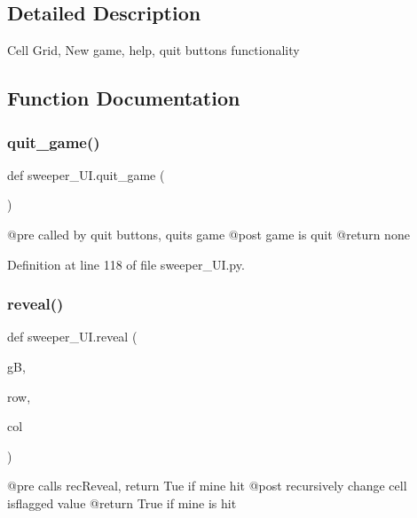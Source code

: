 \subsection{Detailed Description}
\begin{DoxyVerb}Cell Grid, New game, help, quit buttons functionality\end{DoxyVerb}
 

\subsection{Function Documentation}
\mbox{\label{namespacesweeper___u_i_a60d3b69c6e596a8cc72c88a3fd159926}} 
\subsubsection{\texorpdfstring{quit\+\_\+game()}{quit\_game()}}
{\footnotesize\ttfamily def sweeper\+\_\+\+U\+I.\+quit\+\_\+game (\begin{DoxyParamCaption}{ }\end{DoxyParamCaption})}

\begin{DoxyVerb}@pre called by quit buttons, quits game
@post game is quit
@return none
\end{DoxyVerb}
 

Definition at line 118 of file sweeper\+\_\+\+U\+I.\+py.

\mbox{\label{namespacesweeper___u_i_a1d2372a72b38f4c14cfd981325b3ee83}} 
\subsubsection{\texorpdfstring{reveal()}{reveal()}}
{\footnotesize\ttfamily def sweeper\+\_\+\+U\+I.\+reveal (\begin{DoxyParamCaption}\item[{}]{gB,  }\item[{}]{row,  }\item[{}]{col }\end{DoxyParamCaption})}

\begin{DoxyVerb}@pre calls recReveal, return Tue if mine hit
@post recursively change cell isflagged value
@return True if mine is hit
\end{DoxyVerb}
 

